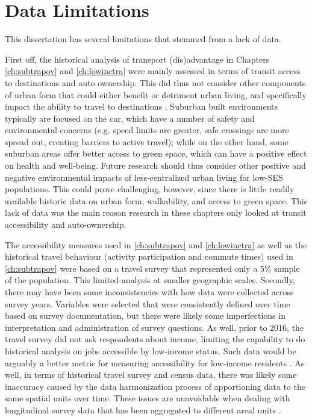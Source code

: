 \section{Data Limitations}

This dissertation has several limitations that stemmed from a lack of data.

First off, the historical analysis of transport (dis)advantage in Chapters \ref{ch:subtrapov} and \ref{ch:lowinctra} were mainly assessed in terms of transit access to destinations and auto ownership. This did thus not consider other components of urban form that could either benefit or detriment urban living, and specifically impact the ability to travel to destinations \cite{ewing_relationship_2003,ewing2014measuring}. Suburban built environments typically are focused on the car, which have a number of safety and environmental concerns (e.g. speed limits are greater, safe crossings are more spread out, creating barriers to active travel); while on the other hand, some suburban areas offer better access to green space, which can have a positive effect on health and well-being. Future research should thus consider other positive and negative environmental impacts of less-centralized urban living for low-SES populations. This could prove challenging, however, since there is little readily available historic data on urban form, walkability, and access to green space. This lack of data was the main reason research in these chapters only looked at transit accessibility and auto-ownership.

The accessibility measures used in \ref{ch:subtrapov} and \ref{ch:lowinctra} as well as the historical travel behaviour (activity participation and commute times) used in \ref{ch:subtrapov} were based on a travel survey that represented only a 5\% sample of the population. This limited analysis at smaller geographic scales. Secondly, there may have been some inconsistencies with how data were collected across survey years. Variables were selected that were consistently defined over time based on survey documentation, but there were likely some imperfections in interpretation and administration of survey questions. As well, prior to 2016, the travel survey did not ask respondents about income, limiting the capability to do historical analysis on jobs accessible by low-income status. Such data would be arguably a better metric for measuring accessibility for low-income residents \cite{fan_impact_2012,cui_accessibility_2019,allen_sizing_2019}. As well, in terms of historical travel survey and census data, there was likely some inaccuracy caused by the data harmonization process of apportioning data to the same spatial units over time. These issues are unavoidable when dealing with longitudinal survey data that has been aggregated to different areal units \cite{logan_interpolating_2014,allen_new_2018}. 


